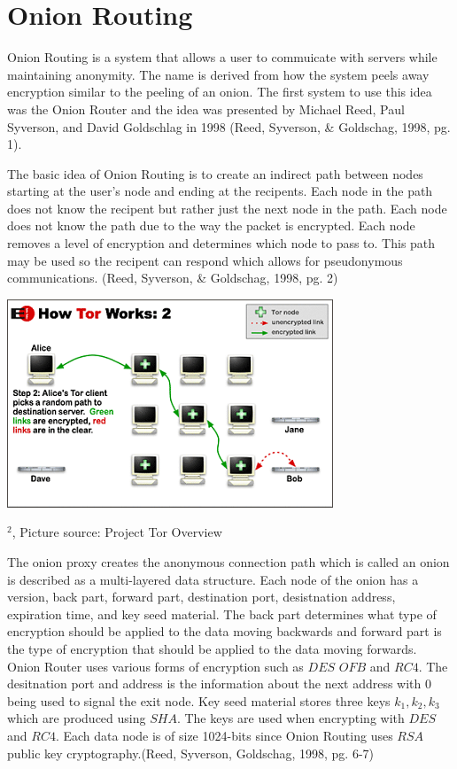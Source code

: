 \documentclass[12pt]{article}
\def\inst#1{$^{#1}$}
\begin{document}
\section{Onion Routing}\label{}
Onion Routing is a system that allows a user to commuicate with servers while maintaining anonymity. The name is derived from how the system peels away encryption similar to the peeling of an onion. The first system to use this idea was the Onion Router and the idea was presented by Michael Reed, Paul Syverson, and David  Goldschlag in 1998 (Reed, Syverson, \& Goldschag, 1998, pg. 1). 

The basic idea of Onion Routing is to create an indirect path between nodes starting at the user's node and ending at the recipents. Each node in the path does not know the recipent but rather just the next node in the path. Each node does not know the path due to the way the packet is encrypted. Each node removes a level of encryption and determines which node to pass to. This path may be used so the recipent can respond which allows for pseudonymous communications. (Reed, Syverson, \& Goldschag, 1998, pg. 2)

\includegraphics{tor-path}
\begin{center}
{\footnotesize
\inst{2}, Picture source: Project Tor Overview}
\end{center}

The onion proxy creates the anonymous connection path which is called an onion is described as a multi-layered data structure. Each node of the onion has a version, back part, forward part, destination port, desistnation address, expiration time, and key seed material. The back part determines what type of encryption should be applied to the data moving backwards and forward part is the type of encryption that should be applied to the data moving forwards.  Onion Router uses various forms of encryption such as $DES$ $OFB$ and $RC4$. The desitnation port and address is the information about the next address with 0 being used to signal the exit node. Key seed material stores three keys $k_1, k_2, k_3$ which are produced using $SHA$. The keys are used when encrypting with $DES$ and $RC4$. Each data node is of size 1024-bits since Onion Routing uses $RSA$ public key cryptography.(Reed, Syverson, Goldschag, 1998, pg. 6-7)
\end{document}
